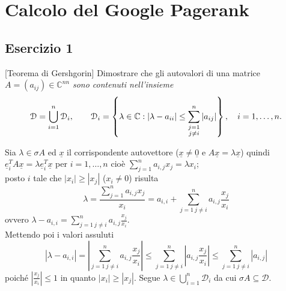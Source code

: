 \chapter{Calcolo del Google Pagerank}
\label{chap:Google}

\section{Esercizio 1}
\label{sub:Es1}
[Teorema di Gershgorin]
      Dimostrare che gli autovalori di una matrice
      $A=(a_{ij})\in\mathbb{C}^{n n}$
      \emph{sono contenuti nell'insieme}
			\[
				\mathcal{D}=\bigcup_{i=1}^n\mathcal{D}_i,\qquad \mathcal{D}_i=\left\{\lambda\in\mathbb{C}:|\lambda-a_{ii}|\leq\sum_{\begin{subarray}{c}
					j=1\\
					j\neq i
				\end{subarray}}^n|a_{ij}|\right\},\quad i=1,\dots,n.
			\]
\begin{sol}
   Sia $\lambda\in\sigma{A}$ ed $\underline{x}$ il corrispondente autovettore ($\underline{x}\neq\underline{0}$
   e $A\underline{x}=\lambda\underline{x}$) quindi $\underline{e}_i^TA\underline{x}=\lambda\underline{e}_i^T\underline{x}$
   per $i=1,\ldots,n$ cioè $\sum_{j=1}^n{a_{i,j}x_j}=\lambda x_i$;\\
   posto $i$ tale che $|x_i|\geq|x_j|$ ($x_i\neq 0$)
   risulta $$\lambda=\frac{\sum_{j=1}^n{a_{i,j}x_j}}{x_i}=a_{i,i}+\sum_{j=1\: j\neq i}^n{a_{i,j}\frac{x_j}{x_i}}$$ ovvero
   $\lambda-a_{i,i}=\sum_{j=1\: j\neq i}^n{a_{i,j}\frac{x_j}{x_i}}$.\\
   Mettendo poi i valori assuluti
   $$\left|\lambda-a_{i,i}\right|=\left|\sum_{j=1\: j\neq i}^n{a_{i,j}\frac{x_j}{x_i}}\right|\leq\sum_{j=1\: j\neq i}^n{\left|a_{i,j}\frac{x_j}{x_i}\right|}\leq\sum_{j=1\: j\neq i}^n{\left|a_{i,j}\right|}$$ poiché $\left|\frac{x_j}{x_i}\right|\leq 1$
   in quanto $|x_i|\geq|x_j|$. Segue $\lambda\in\bigcup_{i=1}^{n}{\mathcal{D}_i}$ da cui $\sigma{A}\subseteq\mathcal{D}$.
\end{sol}



